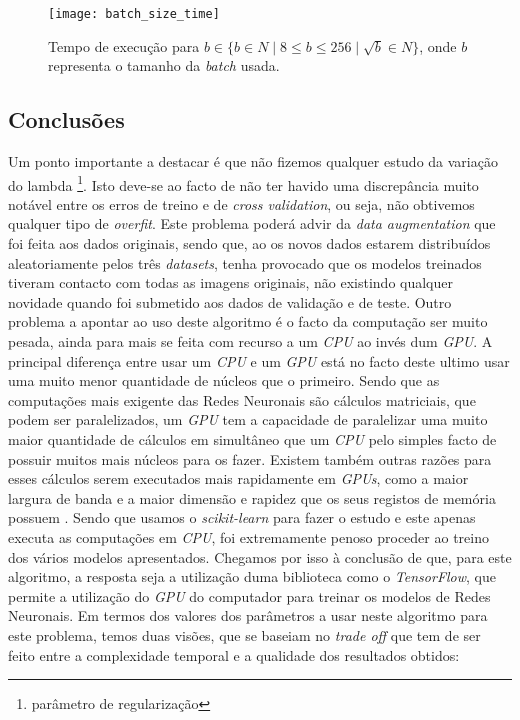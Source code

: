 \begin{figure}[!t]
\centering
\texttt{[image: batch\_size\_time]}
\caption{Tempo de execução para $b \in \{ b \in \!N \mid 8 \leq b \leq 256 \mid \sqrt{b} \in \!N \}$, onde $b$ representa o tamanho da \textit{batch} usada.}
\label{fig:batch_size_time}
\end{figure}
\subsection{Conclusões}
Um ponto importante a destacar é que não fizemos qualquer estudo da variação do lambda \footnote{parâmetro de regularização}. Isto deve-se ao facto de não ter havido uma discrepância muito notável entre os erros de treino e de \textit{cross validation}, ou seja, não obtivemos qualquer tipo de \textit{overfit}. Este problema poderá advir da \textit{data augmentation} que foi feita aos dados originais, sendo que, ao os novos dados estarem distribuídos aleatoriamente pelos três \textit{datasets}, tenha provocado que os modelos treinados tiveram contacto com todas as imagens originais, não existindo qualquer novidade quando foi submetido aos dados de validação e de teste.
Outro problema a apontar ao uso deste algoritmo é o facto da computação ser muito pesada, ainda para mais se feita com recurso a um \textit{CPU} ao invés dum \textit{GPU}. A principal diferença entre usar um \textit{CPU} e um \textit{GPU} está no facto deste ultimo usar   uma muito menor quantidade de núcleos que o primeiro. Sendo que as computações mais exigente das Redes Neuronais são cálculos matriciais, que podem ser paralelizados, um \textit{GPU} tem a capacidade de paralelizar uma muito maior quantidade de cálculos em simultâneo que um \textit{CPU} pelo simples facto de possuir muitos mais núcleos para os fazer. Existem também outras razões para esses cálculos serem executados mais rapidamente em \textit{GPUs}, como a maior largura de banda e a maior dimensão e rapidez que os seus registos de memória possuem \cite{cpu_vs_gpu}. Sendo que usamos o \textit{scikit-learn} para fazer o estudo e este apenas executa as computações em \textit{CPU}, foi extremamente penoso proceder ao treino dos vários modelos apresentados. Chegamos por isso à conclusão de que, para este algoritmo, a resposta seja a utilização duma biblioteca como o \textit{TensorFlow}, que permite a utilização do \textit{GPU} do computador para treinar os modelos de Redes Neuronais.
Em termos dos valores dos parâmetros a usar neste algoritmo para este problema, temos duas visões, que se baseiam no \textit{trade off} que tem de ser feito entre a complexidade temporal e a qualidade dos resultados obtidos:
